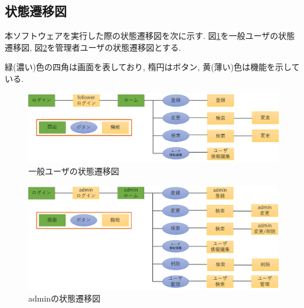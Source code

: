 \documentclass[11ptm]{jsarticle}
\begin{document}
\clearpage
\subsection{状態遷移図}
\label{subsec:状態遷移図}
本ソフトウェアを実行した際の状態遷移図を次に示す. 図\ref{fig:一般ユーザの状態遷移図}を一般ユーザの状態遷移図, 図\ref{fig:adminの状態遷移図}を管理者ユーザの状態遷移図とする. \par
緑(濃い)色の四角は画面を表しており, 楕円はボタン, 黄(薄い)色は機能を示している.
\begin{figure}[h]
  \centering
  \includegraphics[keepaspectratio, width=0.8\linewidth]{follower_transition-diagram.png}
  \caption{\label{fig:一般ユーザの状態遷移図}一般ユーザの状態遷移図}
\end{figure}\par

\begin{figure}[h]
  \centering
  \includegraphics[keepaspectratio, width=0.8\linewidth]{admin_transition-diagram.png}
  \caption{\label{fig:adminの状態遷移図}adminの状態遷移図}
\end{figure}\par

\clearpage
\end{document}
